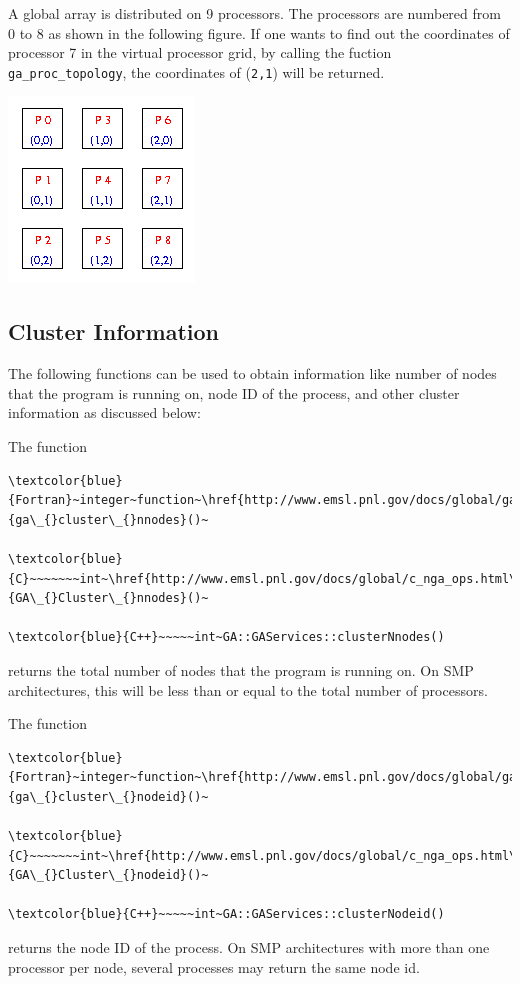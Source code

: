\textit{\textcolor{black}{}}\textit{\textcolor{black}{{}
}}A global array is distributed on 9 processors. The processors are
numbered from 0 to 8 as shown in the following figure. If one wants
to find out the coordinates of processor 7 in the virtual processor
grid, by calling the fuction \texttt{ga\_proc\_topology}, the coordinates
of (\texttt{2,1}) will be returned.

\includegraphics{topo}


\subsection{Cluster Information }

The following functions can be used to obtain information like number
of nodes that the program is running on, node ID of the process, and
other cluster information as discussed below:

The function
\begin{verbatim}
\textcolor{blue}{Fortran}~integer~function~\href{http://www.emsl.pnl.gov/docs/global/ga_ops.html\#ga_cluster_nnodes}{ga\_{}cluster\_{}nnodes}()~

\textcolor{blue}{C}~~~~~~~int~\href{http://www.emsl.pnl.gov/docs/global/c_nga_ops.html\#ga_cluster_nnodes}{GA\_{}Cluster\_{}nnodes}()~

\textcolor{blue}{C++}~~~~~int~GA::GAServices::clusterNnodes()
\end{verbatim}
returns the total number of nodes that the program is running on.
On SMP architectures, this will be less than or equal to the total
number of processors.

The function
\begin{verbatim}
\textcolor{blue}{Fortran}~integer~function~\href{http://www.emsl.pnl.gov/docs/global/ga_ops.html\#ga_cluster_nodeid}{ga\_{}cluster\_{}nodeid}()~

\textcolor{blue}{C}~~~~~~~int~\href{http://www.emsl.pnl.gov/docs/global/c_nga_ops.html\#ga_cluster_nodeid}{GA\_{}Cluster\_{}nodeid}()~

\textcolor{blue}{C++}~~~~~int~GA::GAServices::clusterNodeid()
\end{verbatim}
returns the node ID of the process. On SMP architectures with more
than one processor per node, several processes may return the same
node id.

